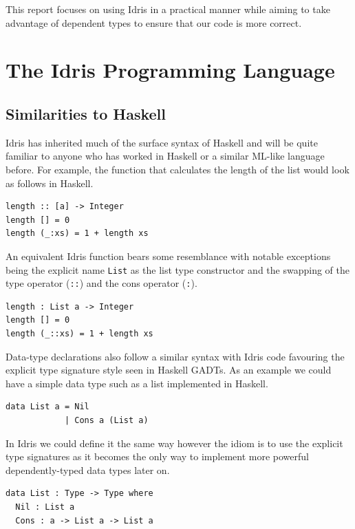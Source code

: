 \documentclass[a4paper, notitlepage]{report}
\begin{document}
This report focuses on using Idris in a practical manner while aiming to take
advantage of dependent types to ensure that our code is more correct.

\section{The Idris Programming Language}
\label{sec:org9a3f44e}
\subsection{Similarities to Haskell}
\label{sec:orgace958a}
Idris has inherited much of the surface syntax of Haskell and will be quite
familiar to anyone who has worked in Haskell or a similar ML-like language
before. For example, the function that calculates the length of the list would
look as follows in Haskell.

\begin{verbatim}
length :: [a] -> Integer
length [] = 0
length (_:xs) = 1 + length xs
\end{verbatim}

An equivalent Idris function bears some resemblance with notable exceptions
being the explicit name \texttt{List} as the list type constructor and the swapping of
the type operator (\texttt{::}) and the cons operator (\texttt{:}).

\begin{verbatim}
length : List a -> Integer
length [] = 0
length (_::xs) = 1 + length xs
\end{verbatim}

Data-type declarations also follow a similar syntax with Idris code favouring
the explicit type signature style seen in Haskell GADTs. As an example we could
have a simple data type such as a list implemented in Haskell.

\begin{verbatim}
data List a = Nil
            | Cons a (List a)
\end{verbatim}

In Idris we could define it the same way however the idiom is to use the
explicit type signatures as it becomes the only way to implement more powerful
dependently-typed data types later on.

\begin{verbatim}
data List : Type -> Type where
  Nil : List a
  Cons : a -> List a -> List a
\end{verbatim}
\end{document}

